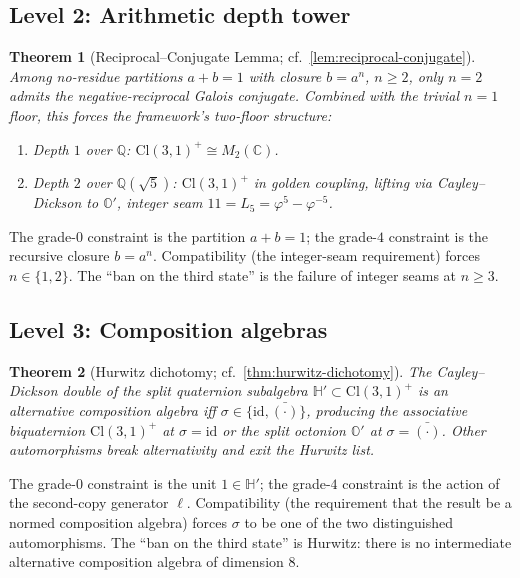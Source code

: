 \documentclass[11pt,a4paper]{article}
\theoremstyle{plain}
\newtheorem{theorem}{Theorem}[section]
\theoremstyle{definition}
\theoremstyle{remark}
\numberwithin{equation}{section}
\providecommand{\Cl}{\mathrm{Cl}}
\providecommand{\C}{\mathbb{C}}
\providecommand{\Q}{\mathbb{Q}}
\providecommand{\Hp}{\mathbb{H}'}
\providecommand{\Os}{\mathbb{O}'}
\providecommand{\vp}{\varphi}
\providecommand{\Lk}{L}
\providecommand{\id}{\mathrm{id}}
\begin{document}
\subsection{Level 2: Arithmetic depth tower}

\begin{theorem}[Reciprocal--Conjugate Lemma; cf.\ \cref{lem:reciprocal-conjugate}]
\label{thm:rcl}
Among no-residue partitions $a + b = 1$ with closure $b = a^n$,
$n \ge 2$, only $n = 2$ admits the negative-reciprocal Galois
conjugate.  Combined with the trivial $n = 1$ floor, this forces
the framework's two-floor structure:
\begin{enumerate}[label=\textnormal{(\arabic*)}]
  \item Depth $1$ over $\Q$: $\Cl(3,1)^+ \cong M_2(\C)$.
  \item Depth $2$ over $\Q(\sqrt 5)$: $\Cl(3,1)^+$ in golden
    coupling, lifting via Cayley--Dickson to $\Os$, integer seam
    $11 = \Lk_5 = \vp^5 - \vp^{-5}$.
\end{enumerate}
\end{theorem}

The grade-$0$ constraint is the partition $a + b = 1$; the
grade-$4$ constraint is the recursive closure $b = a^n$.
Compatibility (the integer-seam requirement) forces $n \in \{1,
2\}$.  The ``ban on the third state'' is the failure of integer
seams at $n \ge 3$.

\subsection{Level 3: Composition algebras}

\begin{theorem}[Hurwitz dichotomy; cf.\ \cref{thm:hurwitz-dichotomy}]
\label{thm:hurwitz-summary}
The Cayley--Dickson double of the split quaternion subalgebra
$\Hp \subset \Cl(3,1)^+$ is an alternative composition algebra iff
$\sigma \in \{\id, \bar{(\cdot)}\}$, producing the associative
biquaternion $\Cl(3,1)^+$ at $\sigma = \id$ or the split octonion
$\Os$ at $\sigma = \bar{(\cdot)}$.  Other automorphisms break
alternativity and exit the Hurwitz list.
\end{theorem}

The grade-$0$ constraint is the unit $1 \in \Hp$; the grade-$4$
constraint is the action of the second-copy generator $\ell$.
Compatibility (the requirement that the result be a normed
composition algebra) forces $\sigma$ to be one of the two
distinguished automorphisms.  The ``ban on the third state'' is
Hurwitz: there is no intermediate alternative composition algebra
of dimension $8$.
\end{document}
